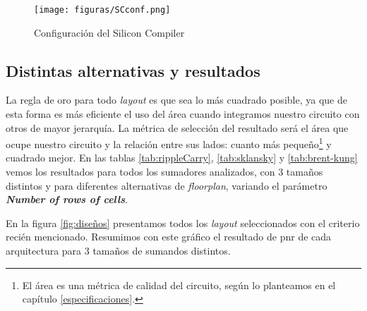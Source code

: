 \begin{figure}[h]
\centering
\texttt{[image: figuras/SCconf.png]}
  \caption{Configuración del Silicon Compiler}
  \label{fig:SCconf}
\end{figure}


\subsection{Distintas alternativas y resultados}
La regla de oro para todo \emph{layout} es que sea lo más cuadrado posible, ya que de esta forma es más eficiente el uso del área cuando integramos nuestro circuito con otros de mayor jerarquía. La métrica de selección del resultado será el área que ocupe nuestro circuito y la relación entre sus lados: cuanto más pequeño\footnote{El área es una métrica de calidad del circuito, según lo planteamos en el capítulo \ref{especificaciones}.} y cuadrado mejor. En las tablas \ref{tab:rippleCarry}, \ref{tab:sklansky} y \ref{tab:brent-kung} vemos los resultados para todos los sumadores analizados, con 3 tamaños distintos y para diferentes alternativas de \emph{floorplan}, variando el parámetro \textbf{\emph{Number of rows of cells}}.

En la figura \ref{fig:diseños} presentamos todos los \emph{layout} seleccionados con el criterio recién mencionado. Resumimos con este gráfico el resultado de \gls{pnr} de cada arquitectura para 3 tamaños de sumandos distintos.
\begin{table}[h]
\centering
{}
\caption{Ubicación y conexionado para Ripple carry en 3 tamaños: 8, 16 y 32 bits}
\label{tab:rippleCarry}
\end{table}

